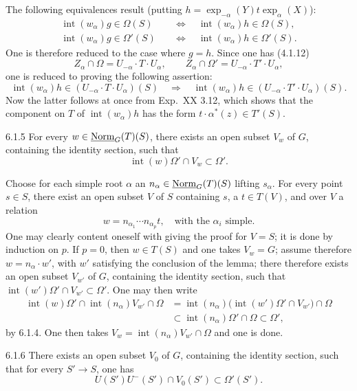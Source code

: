 The following equivalences result (putting $h=\exp_{-\alpha}(Y)t\exp_\alpha(X)$):
\[
\begin{aligned}
\operatorname{int}(w_\alpha)g\in\Omega(S)&\quad\Longleftrightarrow\quad\operatorname{int}(w_\alpha)h\in\Omega(S),\\
\operatorname{int}(w_\alpha)g\in\Omega'(S)&\quad\Longleftrightarrow\quad\operatorname{int}(w_\alpha)h\in\Omega'(S).
\end{aligned}
\]
One is therefore reduced to the case where $g=h$. Since one has (4.1.12)
\[
Z_\alpha\cap\Omega=U_{-\alpha}\cdot T\cdot U_\alpha,\qquad
Z_\alpha\cap\Omega'=U_{-\alpha}\cdot T'\cdot U_\alpha,
\]
one is reduced to proving the following assertion:
\[
\operatorname{int}(w_\alpha)h\in(U_{-\alpha}\cdot T\cdot U_\alpha)(S)\quad\Longrightarrow\quad
\operatorname{int}(w_\alpha)h\in(U_{-\alpha}\cdot T'\cdot U_\alpha)(S).
\]
Now the latter follows at once from Exp.~XX 3.12, which shows that the component on $T$ of $\operatorname{int}(w_\alpha)h$ has the form $t\cdot\alpha^*(z)\in T'(S)$.
\begin{lemma}{6.1.5}\label{XXII.6.1.5}
For every $w\in\underline{\mathrm{Norm}}_G(T)(S)$, there exists an open subset $V_w$ of $G$, containing the identity section, such that
\[
\operatorname{int}(w)\Omega'\cap V_w\subset\Omega'.
\]
\end{lemma}
Choose for each simple root $\alpha$ an $n_\alpha\in\underline{\mathrm{Norm}}_G(T)(S)$ lifting $s_\alpha$. For every point $s\in S$, there exist an open subset $V$ of $S$ containing $s$, a $t\in T(V)$, and over $V$ a relation
\[
w=n_{\alpha_1}\cdots n_{\alpha_p}t,\quad\text{with the $\alpha_i$ simple}.
\]
One may clearly content oneself with giving the proof for $V=S$; it is done by induction on $p$. If $p=0$, then $w\in T(S)$ and one takes $V_w=G$; assume therefore $w=n_\alpha\cdot w'$, with $w'$ satisfying the conclusion of the lemma; there therefore exists an open subset $V_{w'}$ of $G$, containing the identity section, such that $\operatorname{int}(w')\Omega'\cap V_{w'}\subset\Omega'$. One may then write
\[
\begin{aligned}
\operatorname{int}(w)\Omega'\cap\operatorname{int}(n_\alpha)V_{w'}\cap\Omega
&=\operatorname{int}(n_\alpha)\bigl(\operatorname{int}(w')\Omega'\cap V_{w'}\bigr)\cap\Omega\\
&\subset\operatorname{int}(n_\alpha)\Omega'\cap\Omega\subset\Omega',
\end{aligned}
\]
by 6.1.4. One then takes $V_w=\operatorname{int}(n_\alpha)V_{w'}\cap\Omega$ and one is done.
\begin{lemma}{6.1.6}\label{XXII.6.1.6}
There exists an open subset $V_0$ of $G$, containing the identity section, such that for every $S'\to S$, one has
\[
U(S')U^-(S')\cap V_0(S')\subset\Omega'(S').
\]
\end{lemma}
